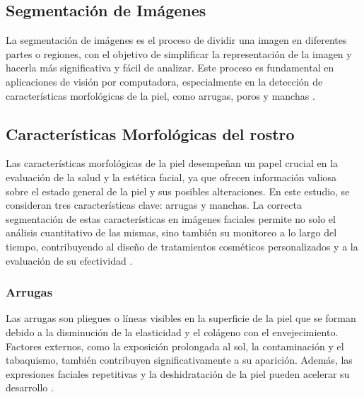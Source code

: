 

\subsection{Segmentación de Imágenes}
La segmentación de imágenes es el proceso de dividir una imagen en diferentes partes o regiones, con el objetivo de simplificar la representación de la imagen y hacerla más significativa y fácil de analizar. Este proceso es fundamental en aplicaciones de visión por computadora, especialmente en la detección de características morfológicas de la piel, como arrugas, poros y manchas \parencite{autor2020segmentacion}.

\subsection{Características Morfológicas del rostro}
Las características morfológicas de la piel desempeñan un papel crucial en la evaluación de la salud y la estética facial, ya que ofrecen información valiosa sobre el estado general de la piel y sus posibles alteraciones. En este estudio, se consideran tres características clave: arrugas y manchas. La correcta segmentación de estas características en imágenes faciales permite no solo el análisis cuantitativo de las mismas, sino también su monitoreo a lo largo del tiempo, contribuyendo al diseño de tratamientos cosméticos personalizados y a la evaluación de su efectividad \cite{autor2021arrugas}.

\subsubsection{Arrugas}
Las arrugas son pliegues o líneas visibles en la superficie de la piel que se forman debido a la disminución de la elasticidad y el colágeno con el envejecimiento. Factores externos, como la exposición prolongada al sol, la contaminación y el tabaquismo, también contribuyen significativamente a su aparición. Además, las expresiones faciales repetitivas y la deshidratación de la piel pueden acelerar su desarrollo \cite{autor2021arrugas}.

